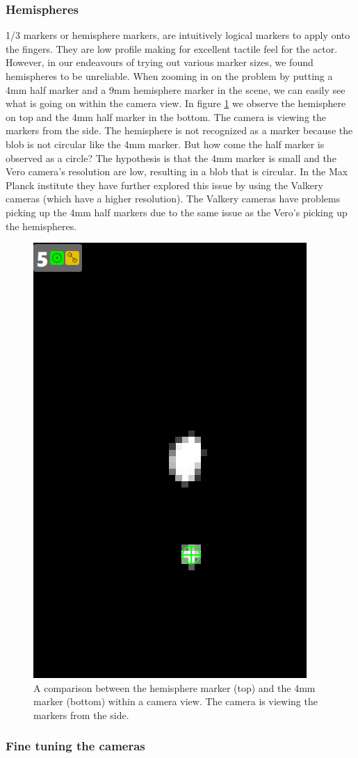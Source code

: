 \documentclass{uva-inf-article}
\begin{document}
\subsubsection{Hemispheres}
1/3 markers or hemisphere markers, are intuitively logical markers to apply onto the fingers. They are low profile making for excellent tactile feel for the actor. However, in our endeavours of trying out various marker sizes, we found hemispheres to be unreliable. When zooming in on the problem by putting a 4mm half marker and a 9mm hemisphere marker in the scene, we can easily see what is going on within the camera view. In figure \ref{fig:hemisphere} we observe the hemisphere on top and the 4mm half marker in the bottom. The camera is viewing the markers from the side. The hemisphere is not recognized as a marker because the blob is not circular like the 4mm marker. But how come the half marker is observed as a circle? The hypothesis is that the 4mm marker is small and the Vero camera's resolution are low, resulting in a blob that is circular. In the Max Planck institute they have further explored this issue by using the Valkery cameras (which have a higher resolution). The Valkery cameras have problems picking up the 4mm half markers due to the same issue as the Vero's picking up the hemispheres.
\begin{figure}[hbt!]
    \centering
    \includegraphics[width=.4\textwidth]{imgs/Hemisphere.png}
    \caption{A comparison between the hemisphere marker (top) and the 4mm marker (bottom) within a camera view. The camera is viewing the markers from the side.}
    \label{fig:hemisphere}
\end{figure}

\subsubsection{Fine tuning the cameras}
\end{document}
